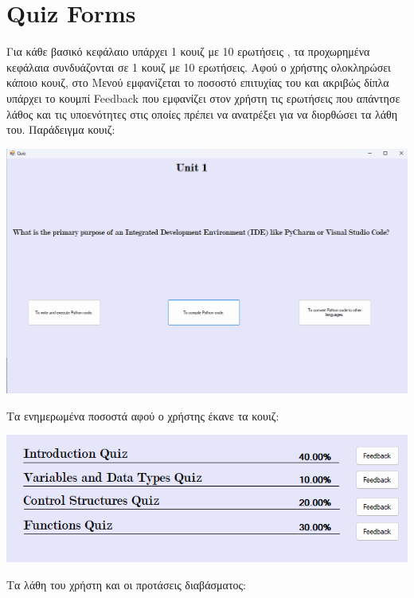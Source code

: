\documentclass[12pt]{article}
\newcommand{\en}[1]{\foreignlanguage{English}{#1}}
\begin{document}
\section*{\en{Quiz Forms}}
Για κάθε βασικό κεφάλαιο υπάρχει 1 κουιζ με 10 ερωτήσεις , τα προχωρημένα κεφάλαια συνδυάζονται σε 1 κουιζ με 10 ερωτήσεις.
Αφού ο χρήστης ολοκληρώσει κάποιο κουιζ, στο Μενού εμφανίζεται το ποσοστό επιτυχίας του και ακριβώς δίπλα υπάρχει το κουμπί \en{Feedback} που εμφανίζει στον χρήστη τις ερωτήσεις που απάντησε λάθος και τις υποενότητες στις οποίες πρέπει να ανατρέξει για να διορθώσει τα λάθη του.
\newpage
Παράδειγμα κουιζ:
\begin{center}

    \includegraphics[width=1\linewidth]{quizform.png}
\end{center}
Τα ενημερωμένα ποσοστά αφού ο χρήστης έκανε τα κουιζ:
\begin{center}
    
    \includegraphics[width=0.8\linewidth]{pososta.png}
\end{center}
\newpage
Τα λάθη του χρήστη και οι προτάσεις διαβάσματος:
\end{document}
